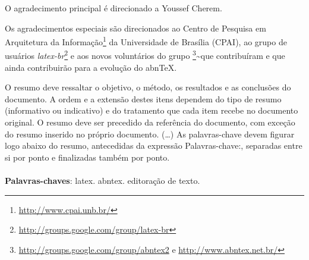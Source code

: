 \documentclass[
	12pt,				%
	openright,			%
	twoside,			%
	a4paper,			%
	english,			%
	french,				%
	spanish,			%
	brazil,				%
]{abntex2}
\begin{document}

\frenchspacing 


\imprimircapa

\imprimirfolhaderosto*

\begin{agradecimentos}
  O agradecimento principal é direcionado a Youssef Cherem.
  
  Os agradecimentos especiais são direcionados ao Centro de Pesquisa em
  Arquitetura da Informação\footnote{\url{http://www.cpai.unb.br/}} da
  Universidade de Brasília (CPAI), ao grupo de usuários
  \emph{latex-br}\footnote{\url{http://groups.google.com/group/latex-br}}
  e aos novos voluntários do grupo
  \emph{\abnTeX}\footnote{\url{http://groups.google.com/group/abntex2} e
  \url{http://www.abntex.net.br/}}\textasciitilde{}que contribuíram e que
  ainda contribuirão para a evolução do abn\TeX.
\end{agradecimentos}


\setlength{\absparsep}{18pt} %
\begin{resumo}
 O resumo deve ressaltar o objetivo, o método, os resultados e as
 conclusões do documento. A ordem e a extensão destes itens dependem do
 tipo de resumo (informativo ou indicativo) e do tratamento que cada item
 recebe no documento original. O resumo deve ser precedido da referência
 do documento, com exceção do resumo inserido no próprio documento.
 (\ldots) As palavras-chave devem figurar logo abaixo do resumo,
 antecedidas da expressão Palavras-chave:, separadas entre si por ponto e
 finalizadas também por ponto.
 \noindent
 \\
 \\
 \textbf{Palavras-chaves}: latex. abntex. editoração de texto.
\end{resumo}

\listoffigures*
\cleardoublepage
\end{document}
